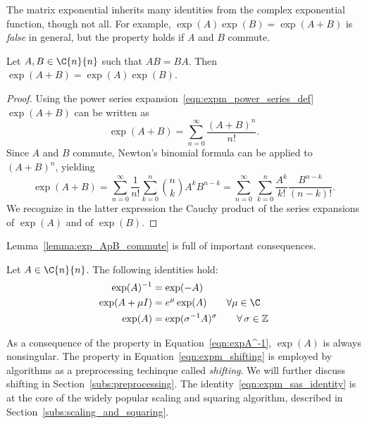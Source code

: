 The matrix exponential inherits many identities from the complex exponential function, though not all. For example, $\exp(A)\exp(B)=\exp(A+B)$ is \emph{false} in general, but the property holds if $A$ and $B$ commute. 
\begin{lemma}\label{lemma:exp_ApB_commute}
	Let $A,B\in\C{n}{n}$ such that $AB=BA$. Then $\exp(A+B)=\exp(A)\exp(B)$.
\end{lemma}
\begin{proof}
	Using the power series expansion~\eqref{eqn:expm_power_series_def} $\exp(A+B)$ can be written as
	\[
		\exp(A+B) = \sum_{n=0}^{\infty}\frac{(A+B)^n}{n!}.
	\]
	Since $A$ and $B$ commute, Newton's binomial formula can be applied to $(A+B)^n$, yielding
	\[
		\exp(A+B) = \sum_{n=0}^{\infty}\frac{1}{n!}\sum_{k=0}^n \binom{n}{k}A^kB^{n-k} = \sum_{n=0}^{\infty}\,\sum_{k=0}^n\frac{A^k}{k!}\frac{B^{n-k}}{(n-k)!}.
	\]
	We recognize in the latter expression the Cauchy product of the series expansions of $\exp(A)$ and of $\exp(B)$.
\end{proof}
Lemma~\ref{lemma:exp_ApB_commute} is full of important consequences.
\begin{corollario_lemma}
	Let $A\in\C{n}{n}$. The following identities hold:
	\begin{align}
		\exp(A)^{-1} &= \exp(-A) \label{eqn:expA^-1}\\
		\exp(A+\mu I) &= e^{\mu}\exp(A)\qquad\forall\mu\in\C \label{eqn:expm_shifting}\\
		\exp(A) &= \exp(\sigma^{-1}A)^{\sigma}\qquad\forall\,\sigma\in\mathbb{Z} \label{eqn:expm_sas_identity}
	\end{align}
\end{corollario_lemma}
As a consequence of the property in Equation~\eqref{eqn:expA^-1}, $\exp(A)$ is always nonsingular.
The property in Equation~\ref{eqn:expm_shifting} is employed by algorithms as a preprocessing techinque called \emph{shifting}. We will further discuss shifting in Section~\ref{subs:preprocessing}.
The identity~\eqref{eqn:expm_sas_identity} is at the core of the widely popular scaling and squaring algorithm, described in Section~\ref{subs:scaling_and_squaring}.
	

